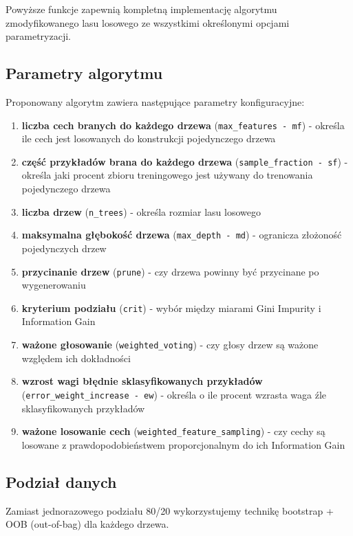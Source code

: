 \documentclass[11pt,a4paper]{article}
\begin{document}
Powyższe funkcje zapewnią kompletną implementację algorytmu zmodyfikowanego lasu losowego ze wszystkimi określonymi opcjami parametryzacji.

\subsection{Parametry algorytmu}

Proponowany algorytm zawiera następujące parametry konfiguracyjne:

\begin{enumerate}
    \item \textbf{liczba cech branych do każdego drzewa} (\texttt{max\_features - mf}) - określa ile cech jest losowanych do konstrukcji pojedynczego drzewa
    \item \textbf{część przykładów brana do każdego drzewa} (\texttt{sample\_fraction - sf}) - określa jaki procent zbioru treningowego jest używany do trenowania pojedynczego drzewa
    \item \textbf{liczba drzew} (\texttt{n\_trees}) - określa rozmiar lasu losowego
    \item \textbf{maksymalna głębokość drzewa} (\texttt{max\_depth - md}) - ogranicza złożoność pojedynczych drzew
    \item \textbf{przycinanie drzew} (\texttt{prune}) - czy drzewa powinny być przycinane po wygenerowaniu
    \item \textbf{kryterium podziału} (\texttt{crit}) - wybór między miarami Gini Impurity i Information Gain
    \item \textbf{ważone głosowanie} (\texttt{weighted\_voting}) - czy głosy drzew są ważone względem ich dokładności
    \item \textbf{wzrost wagi błędnie sklasyfikowanych przykładów} (\texttt{error\_weight\_increase - ew}) - określa o ile procent wzrasta waga źle sklasyfikowanych przykładów
    \item \textbf{ważone losowanie cech} (\texttt{weighted\_feature\_sampling}) - czy cechy są losowane z prawdopodobieństwem proporcjonalnym do ich Information Gain
\end{enumerate}

\subsection{Podział danych}
Zamiast jednorazowego podziału 80/20 wykorzystujemy technikę bootstrap + OOB (out-of-bag) dla każdego drzewa.
\end{document}
